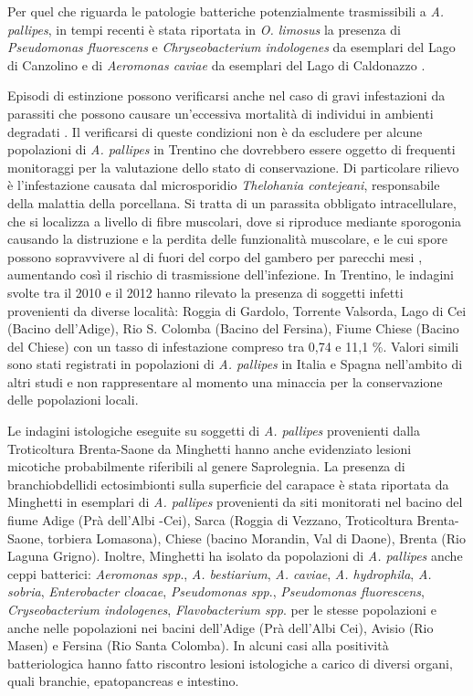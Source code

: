 \documentclass[11pt,a4paper,italian,twoside,openany]{memoir}
\begin{document}
Per quel che riguarda le patologie batteriche potenzialmente trasmissibili a \emph{A. pallipes}, in tempi recenti è stata riportata in \emph{O. limosus} la presenza di \emph{Pseudomonas fluorescens} e \emph{Chryseobacterium indologenes} da esemplari del Lago di Canzolino e di \emph{Aeromonas caviae} da esemplari del Lago di Caldonazzo \cite{Minghetti 2012b}.

Episodi di estinzione possono verificarsi anche nel caso di gravi infestazioni da parassiti che possono causare un'eccessiva mortalità di individui in ambienti degradati \cite{Vogt 1999}. Il verificarsi di queste condizioni non è da escludere per alcune popolazioni di \emph{A. pallipes} in Trentino che dovrebbero essere oggetto di frequenti monitoraggi per la valutazione dello stato di conservazione. Di particolare rilievo è l'infestazione causata dal microsporidio \emph{Thelohania contejeani}, responsabile della malattia della porcellana. Si tratta di un parassita obbligato intracellulare, che si localizza a livello di fibre muscolari, dove si riproduce mediante sporogonia causando la distruzione e la perdita delle funzionalità muscolare, e le cui spore possono sopravvivere al di fuori del corpo del gambero per parecchi mesi \cite{Dieguez Uribeondo 2006}, aumentando così il rischio di trasmissione dell'infezione. In Trentino, le indagini svolte tra il 2010 e il 2012 \cite{Minghetti 2012b} \cite{Endrizzi 2013} hanno rilevato la presenza di soggetti infetti provenienti da diverse località: Roggia di Gardolo, Torrente Valsorda, Lago di Cei (Bacino dell'Adige), Rio S. Colomba (Bacino del Fersina), Fiume Chiese (Bacino del Chiese) con un tasso di infestazione compreso tra 0,74 e 11,1 \%. Valori simili sono stati registrati in popolazioni di \emph{A. pallipes} in Italia e Spagna nell'ambito di altri studi \cite{Dieguez Uribeondo 1997} \cite{Mori 2000} e non rappresentare al momento una minaccia per la conservazione delle popolazioni locali.

Le indagini istologiche eseguite su soggetti di \emph{A. pallipes} provenienti dalla Troticoltura Brenta-Saone da Minghetti \cite{Minghetti 2012b} hanno anche evidenziato lesioni micotiche probabilmente riferibili al genere Saprolegnia. La presenza di branchiobdellidi ectosimbionti sulla superficie del carapace è stata riportata da Minghetti \cite{Minghetti 2012b} in esemplari di \emph{A. pallipes} provenienti da siti monitorati nel bacino del fiume Adige (Prà dell'Albi -Cei), Sarca (Roggia di Vezzano, Troticoltura Brenta-Saone, torbiera Lomasona), Chiese (bacino Morandin, Val di Daone), Brenta (Rio Laguna Grigno). Inoltre, Minghetti \cite{Minghetti 2012b} ha isolato da popolazioni di \emph{A. pallipes} anche ceppi batterici: \emph{Aeromonas spp}., \emph{A. bestiarium}, \emph{A. caviae}, \emph{A. hydrophila}, \emph{A. sobria}, \emph{Enterobacter cloacae}, \emph{Pseudomonas spp}., \emph{Pseudomonas fluorescens}, \emph{Cryseobacterium indologenes}, \emph{Flavobacterium spp}. per le stesse popolazioni e anche nelle popolazioni nei bacini dell'Adige (Prà dell'Albi Cei), Avisio (Rio Masen) e Fersina (Rio Santa Colomba). In alcuni casi alla positività batteriologica hanno fatto riscontro lesioni istologiche a carico di diversi organi, quali branchie, epatopancreas e intestino.
\end{document}
